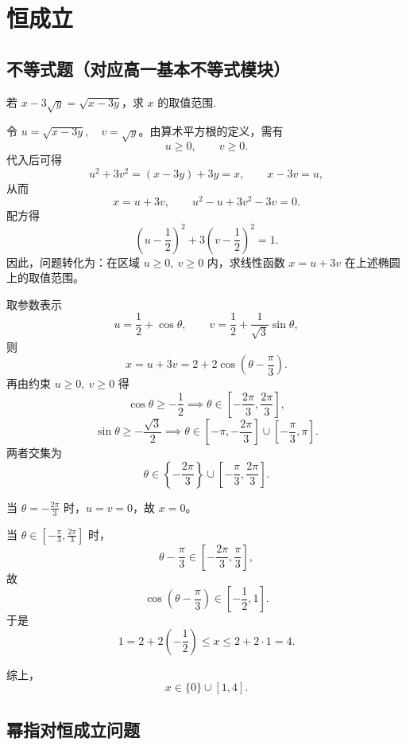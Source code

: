 \chapter{恒成立}
\section{不等式题（对应高一基本不等式模块）}
\begin{example}[数海漫游考前100题]
    若 $x - 3\sqrt{y} = \sqrt{x - 3y}$，求 $x$ 的取值范围.
\end{example}
\begin{solution}
令 $u = \sqrt{x - 3y}, \quad v = \sqrt{y}$。由算术平方根的定义，需有
\[
u \geqslant 0,\qquad v \geqslant 0.
\]
代入后可得
\[
u^2 + 3v^2 = (x-3y)+3y = x,
\qquad
x-3v=u,
\]
从而
\[
x=u+3v,\qquad u^2-u+3v^2-3v=0.
\]
配方得
\[
\left(u - \frac{1}{2}\right)^2 + 3\left(v - \frac{1}{2}\right)^2 = 1.
\]
因此，问题转化为：在区域 $u \geqslant 0,\ v \geqslant 0$ 内，求线性函数 $x=u+3v$ 在上述椭圆上的取值范围。

取参数表示
\[
u = \frac{1}{2} + \cos\theta,\qquad
v = \frac{1}{2} + \frac{1}{\sqrt{3}}\sin\theta,
\]
则
\[
x = u+3v = 2 + 2\cos\left(\theta - \frac{\pi}{3}\right).
\]
再由约束 $u \geqslant 0,\ v \geqslant 0$ 得
\[
\cos\theta \geqslant -\frac{1}{2}
\implies
\theta \in \left[-\frac{2\pi}{3}, \frac{2\pi}{3}\right],
\]
\[
\sin\theta \geqslant -\frac{\sqrt{3}}{2}
\implies
\theta \in \left[-\pi, -\frac{2\pi}{3}\right] \cup \left[-\frac{\pi}{3}, \pi\right].
\]
两者交集为
\[
\theta \in \left\{-\frac{2\pi}{3}\right\} \cup \left[-\frac{\pi}{3}, \frac{2\pi}{3}\right].
\]

当 $\theta = -\frac{2\pi}{3}$ 时，$u=v=0$，故 $x=0$。

当 $\theta \in \left[-\frac{\pi}{3}, \frac{2\pi}{3}\right]$ 时，
\[
\theta-\frac{\pi}{3}\in\left[-\frac{2\pi}{3}, \frac{\pi}{3}\right],
\]
故
\[
\cos\left(\theta-\frac{\pi}{3}\right)\in\left[-\frac{1}{2},1\right].
\]
于是
\[
1 = 2+2\left(-\frac{1}{2}\right) \leqslant x \leqslant 2+2\cdot 1 = 4.
\]

综上，
\[
x \in \{0\} \cup [1,4].
\]
\end{solution}

\section{幂指对恒成立问题}

